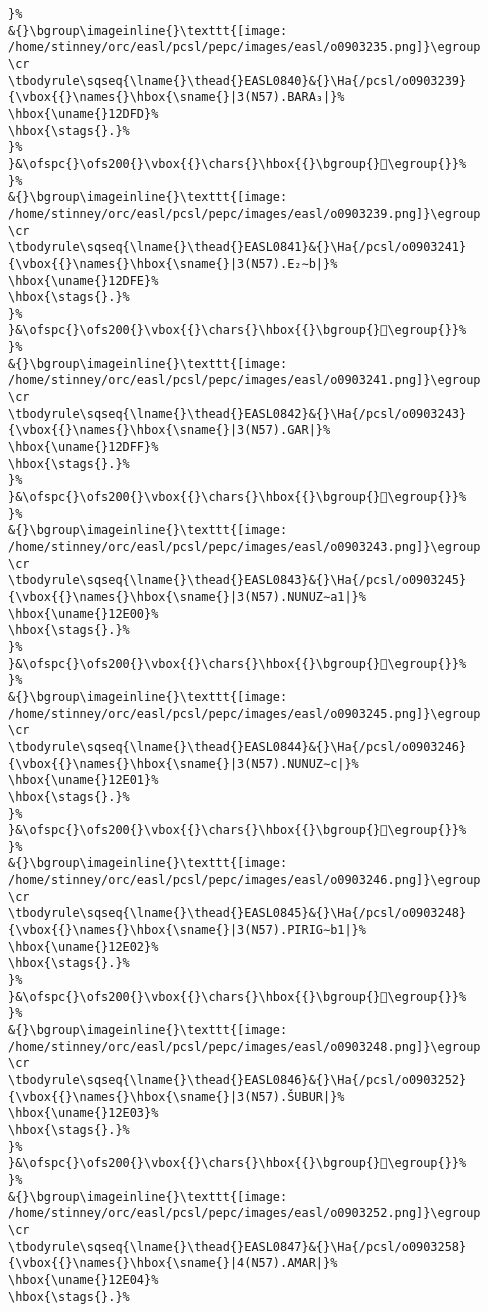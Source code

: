 \begin{verbatim}
}%
&{}\bgroup\imageinline{}\texttt{[image: /home/stinney/orc/easl/pcsl/pepc/images/easl/o0903235.png]}\egroup
\cr
\tbodyrule\sqseq{\lname{}\thead{}EASL0840}&{}\Ha{/pcsl/o0903239}{\vbox{{}\names{}\hbox{\sname{}|3(N57).BARA₃|}%
\hbox{\uname{}12DFD}%
\hbox{\stags{}.}%
}%
}&\ofspc{}\ofs200{}\vbox{{}\chars{}\hbox{{}\bgroup{}𒷽\egroup{}}%
}%
&{}\bgroup\imageinline{}\texttt{[image: /home/stinney/orc/easl/pcsl/pepc/images/easl/o0903239.png]}\egroup
\cr
\tbodyrule\sqseq{\lname{}\thead{}EASL0841}&{}\Ha{/pcsl/o0903241}{\vbox{{}\names{}\hbox{\sname{}|3(N57).E₂∼b|}%
\hbox{\uname{}12DFE}%
\hbox{\stags{}.}%
}%
}&\ofspc{}\ofs200{}\vbox{{}\chars{}\hbox{{}\bgroup{}𒷾\egroup{}}%
}%
&{}\bgroup\imageinline{}\texttt{[image: /home/stinney/orc/easl/pcsl/pepc/images/easl/o0903241.png]}\egroup
\cr
\tbodyrule\sqseq{\lname{}\thead{}EASL0842}&{}\Ha{/pcsl/o0903243}{\vbox{{}\names{}\hbox{\sname{}|3(N57).GAR|}%
\hbox{\uname{}12DFF}%
\hbox{\stags{}.}%
}%
}&\ofspc{}\ofs200{}\vbox{{}\chars{}\hbox{{}\bgroup{}𒷿\egroup{}}%
}%
&{}\bgroup\imageinline{}\texttt{[image: /home/stinney/orc/easl/pcsl/pepc/images/easl/o0903243.png]}\egroup
\cr
\tbodyrule\sqseq{\lname{}\thead{}EASL0843}&{}\Ha{/pcsl/o0903245}{\vbox{{}\names{}\hbox{\sname{}|3(N57).NUNUZ∼a1|}%
\hbox{\uname{}12E00}%
\hbox{\stags{}.}%
}%
}&\ofspc{}\ofs200{}\vbox{{}\chars{}\hbox{{}\bgroup{}𒸀\egroup{}}%
}%
&{}\bgroup\imageinline{}\texttt{[image: /home/stinney/orc/easl/pcsl/pepc/images/easl/o0903245.png]}\egroup
\cr
\tbodyrule\sqseq{\lname{}\thead{}EASL0844}&{}\Ha{/pcsl/o0903246}{\vbox{{}\names{}\hbox{\sname{}|3(N57).NUNUZ∼c|}%
\hbox{\uname{}12E01}%
\hbox{\stags{}.}%
}%
}&\ofspc{}\ofs200{}\vbox{{}\chars{}\hbox{{}\bgroup{}𒸁\egroup{}}%
}%
&{}\bgroup\imageinline{}\texttt{[image: /home/stinney/orc/easl/pcsl/pepc/images/easl/o0903246.png]}\egroup
\cr
\tbodyrule\sqseq{\lname{}\thead{}EASL0845}&{}\Ha{/pcsl/o0903248}{\vbox{{}\names{}\hbox{\sname{}|3(N57).PIRIG∼b1|}%
\hbox{\uname{}12E02}%
\hbox{\stags{}.}%
}%
}&\ofspc{}\ofs200{}\vbox{{}\chars{}\hbox{{}\bgroup{}𒸂\egroup{}}%
}%
&{}\bgroup\imageinline{}\texttt{[image: /home/stinney/orc/easl/pcsl/pepc/images/easl/o0903248.png]}\egroup
\cr
\tbodyrule\sqseq{\lname{}\thead{}EASL0846}&{}\Ha{/pcsl/o0903252}{\vbox{{}\names{}\hbox{\sname{}|3(N57).ŠUBUR|}%
\hbox{\uname{}12E03}%
\hbox{\stags{}.}%
}%
}&\ofspc{}\ofs200{}\vbox{{}\chars{}\hbox{{}\bgroup{}𒸃\egroup{}}%
}%
&{}\bgroup\imageinline{}\texttt{[image: /home/stinney/orc/easl/pcsl/pepc/images/easl/o0903252.png]}\egroup
\cr
\tbodyrule\sqseq{\lname{}\thead{}EASL0847}&{}\Ha{/pcsl/o0903258}{\vbox{{}\names{}\hbox{\sname{}|4(N57).AMAR|}%
\hbox{\uname{}12E04}%
\hbox{\stags{}.}%

\end{verbatim}
